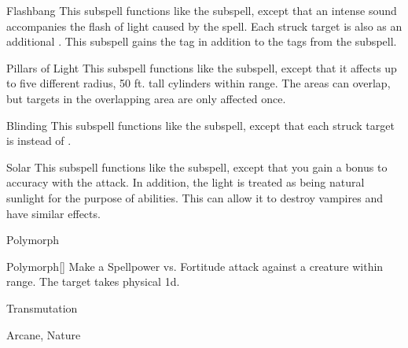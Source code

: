 \begin{ability}[\nth{4}]{Flashbang}
This subspell functions like the  subspell, except that an intense sound accompanies the flash of light caused by the spell.
Each struck target is also  as an additional .
This subspell gains the  tag in addition to the tags from the  subspell.
\end{ability}
\vspace{0.25em}


\begin{ability}[\nth{4}]{Pillars of Light}
This subspell functions like the  subspell, except that it affects up to five different \areasmall radius, 50 ft. tall cylinders within range.
The areas can overlap, but targets in the overlapping area are only affected once.
\end{ability}
\vspace{0.25em}


\begin{ability}[\nth{5}]{Blinding}
This subspell functions like the  subspell, except that each struck target is  instead of .
\end{ability}
\vspace{0.25em}


\begin{ability}[\nth{6}]{Solar}
This subspell functions like the  subspell, except that you gain a  bonus to accuracy with the attack.
In addition, the light is treated as being natural sunlight for the purpose of abilities.
This can allow it to destroy vampires and have similar effects.
\end{ability}
\vspace{0.25em}

\newpage
\begin{spellsection}{Polymorph}

\begin{spellheader}
\end{spellheader}


\begin{ability}{Polymorph}[]
Make a Spellpower vs. Fortitude attack against a creature within \rngmed range.
\hit The target takes physical  \minus1d.
\end{ability}




 Transmutation

 Arcane, Nature
\end{spellsection}


